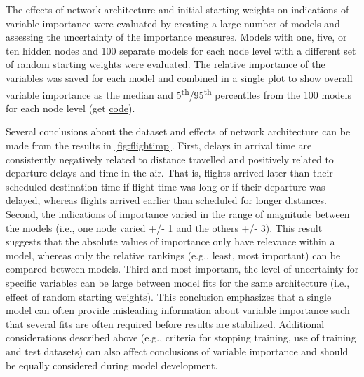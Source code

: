 \documentclass[article,shortnames]{jss}\usepackage[]{graphicx}\usepackage[]{color}
\begin{document}
The effects of network architecture and initial starting weights on indications of variable importance were evaluated by creating a large number of models and assessing the uncertainty of the importance measures.  Models with one, five, or ten hidden nodes and 100 separate models for each node level with a different set of random starting weights were evaluated.  The relative importance of the variables was saved for each model and combined in a single plot to show overall variable importance as the median and 5\textsuperscript{th}/95\textsuperscript{th} percentiles from the 100 models for each node level (get \href{https://raw.githubusercontent.com/fawda123/nnt_manu/master/flightimp.R}{code}). 

Several conclusions about the dataset and effects of network architecture can be made from the results in \cref{fig:flightimp}.  First, delays in arrival time are consistently negatively related to distance travelled and positively related to departure delays and time in the air.  That is, flights arrived later than their scheduled destination time if flight time was long or if their departure was delayed, whereas flights arrived earlier than scheduled for longer distances.  Second, the indications of importance varied in the range of magnitude between the models (i.e., one node  varied +/- 1 and the others +/- 3).  This result suggests that the absolute values of importance only have relevance within a model, whereas only the relative rankings (e.g., least, most important) can be compared between models.  Third and most important, the level of uncertainty for specific variables can be large between model fits for the same architecture (i.e., effect of random starting weights).  This conclusion emphasizes that a single model can often provide misleading information about variable importance such that several fits are often required before results are stabilized.  Additional considerations described above (e.g., criteria for stopping training, use of training and test datasets) can also affect conclusions of variable importance and should be equally considered during model development.
\end{document}
